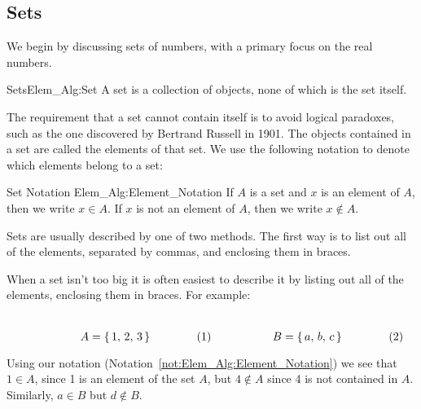 \documentclass[crop=false,class=book,oneside]{standalone}                      %
\begin{document}
        \subsection{Sets}
            We begin by discussing sets of numbers,
            with a primary focus on the real numbers.
            \begin{fdefinition}{Sets}{Elem_Alg:Set}
                A set is a collection of objects,
                none of which is the set itself.
            \end{fdefinition}
            The requirement that a set cannot contain itself
            is to avoid logical paradoxes, such as the one
            discovered by  Bertrand Russell in 1901. The
            objects contained in a set are called the elements of
            that set. We use the following notation to denote
            which elements belong to a set:
            \begin{fnotation}{Set Notation}
                  {Elem_Alg:Element_Notation}
                If $A$ is a set and $x$ is an element
                of $A$, then we write $x\in{A}$.
                If $x$ is not an element of $A$,
                then we write $x\notin{A}$.
            \end{fnotation}
            Sets are usually described by one of
            two methods. The first way is to list out
            all of the elements, separated by commas,
            and enclosing them in braces.
            \begin{lexample}
                When a set isn't too big it is
                often easiest to describe it by
                listing out all of the elements, enclosing
                them in braces. For example:
                \par
                \begin{subequations}
                    \begin{minipage}{0.49\textwidth}
                        \centering
                        \begin{equation}
                            A=\{\,1,\,2,\,3\,\}
                        \end{equation}
                    \end{minipage}
                    \hfill
                    \begin{minipage}{0.49\textwidth}
                        \centering
                        \begin{equation}
                            B=\{\,a,\,b,\,c\,\}
                        \end{equation}
                    \end{minipage}
                \end{subequations}
                \par\hfill\par
                Using our notation
                (Notation~\ref{not:Elem_Alg:Element_Notation})
                we see that $1\in{A}$, since 1 is an element
                of the set $A$, but $4\notin{A}$ since 4 is
                not contained in $A$. Similarly, $a\in{B}$
                but $d\notin{B}$.
            \end{lexample}
\end{document}
